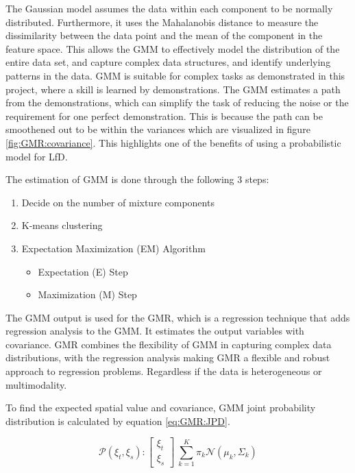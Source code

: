 The Gaussian model assumes the data within each component to be normally distributed. Furthermore, it uses the Mahalanobis distance to measure the dissimilarity between the data point and the mean of the component in the feature space.
This allows the GMM to effectively model the distribution of the entire data set, and capture complex data structures, and identify underlying patterns in the data.
GMM is suitable for complex tasks as demonstrated in this project, where a skill is learned by demonstrations. 
The GMM estimates a path from the demonstrations, which can simplify the task of reducing the noise or the requirement for one perfect demonstration. This is because the path can be smoothened out to be within the variances which are visualized in figure \ref{fig:GMR:covariance}. This highlights one of the benefits of using a probabilistic model for LfD.

The estimation of GMM is done through the following 3 steps:
\begin{enumerate}
    \item Decide on the number of mixture components
    \item K-means clustering
    \item Expectation Maximization (EM) Algorithm
    \begin{itemize}
        \item Expectation (E) Step
        \item Maximization (M) Step
    \end{itemize} 
\end{enumerate}

The GMM output is used for the GMR, which is a regression technique that adds regression analysis to the GMM. It estimates the output variables with covariance.
GMR combines the flexibility of GMM in capturing complex data distributions, with the regression analysis making GMR a flexible and robust approach to regression problems. Regardless if the data is heterogeneous or multimodality.

To find the expected spatial value and covariance, GMM joint probability distribution is calculated by equation \ref{eq:GMR:JPD}.

\begin{equation}
    \mathcal{P} (\xi_t, \xi_s): \begin{bmatrix}
                                    \xi_t \\
                                    \xi_s
                                \end{bmatrix} ~ \sum_{k=1}^{K} \pi_k \mathcal{N} (\mu_k, \Sigma_k)
    \label{eq:GMR:JPD}
\end{equation}

